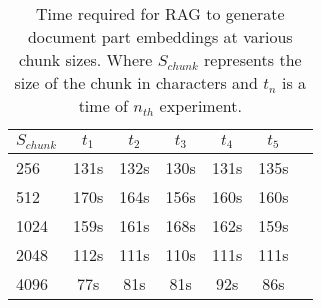 \begin{table}[ht!]
  \centering
  \begin{tabular}{lcccccc}
    \toprule
    $S_{chunk}$ & $t_1$ & $t_2$ & $t_3$ & $t_4$ & $t_5$ \\
    \midrule
    256  & 131s & 132s & 130s & 131s & 135s \\
    512  & 170s & 164s & 156s & 160s & 160s \\
    1024  & 159s & 161s & 168s & 162s & 159s \\
    2048  & 112s & 111s & 110s & 111s & 111s \\
    4096  & 77s & 81s & 81s & 92s & 86s \\
    \bottomrule
  \end{tabular}
  \caption{Time required for \ac{RAG} to generate document part embeddings at various chunk sizes.
    Where $S_{chunk}$ represents the size of the chunk in characters and $t_n$ is a time of $n_{th}$ experiment.}
  \label{tab:RAG_time}
\end{table}
  
